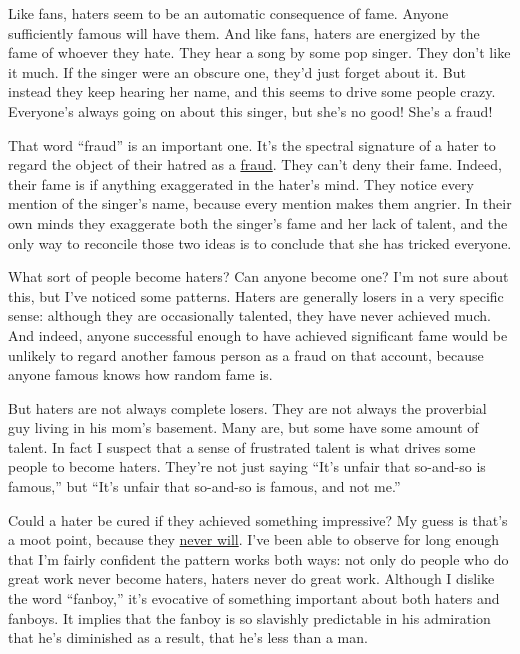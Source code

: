 Like fans, haters seem to be an automatic consequence of fame. Anyone
sufficiently famous will have them. And like fans, haters are energized
by the fame of whoever they hate. They hear a song by some pop singer.
They don't like it much. If the singer were an obscure one, they'd just
forget about it. But instead they keep hearing her name, and this seems
to drive some people crazy. Everyone's always going on about this
singer, but she's no good! She's a fraud!

That word ``fraud'' is an important one. It's the spectral signature of
a hater to regard the object of their hatred as a
\href{https://twitter.com/search?q=Musk\%20fraud&src=typed_query&f=live}{fraud}.
They can't deny their fame. Indeed, their fame is if anything
exaggerated in the hater's mind. They notice every mention of the
singer's name, because every mention makes them angrier. In their own
minds they exaggerate both the singer's fame and her lack of talent, and
the only way to reconcile those two ideas is to conclude that she has
tricked everyone.

What sort of people become haters? Can anyone become one? I'm not sure
about this, but I've noticed some patterns. Haters are generally losers
in a very specific sense: although they are occasionally talented, they
have never achieved much. And indeed, anyone successful enough to have
achieved significant fame would be unlikely to regard another famous
person as a fraud on that account, because anyone famous knows how
random fame is.

But haters are not always complete losers. They are not always the
proverbial guy living in his mom's basement. Many are, but some have
some amount of talent. In fact I suspect that a sense of frustrated
talent is what drives some people to become haters. They're not just
saying ``It's unfair that so-and-so is famous,'' but ``It's unfair that
so-and-so is famous, and not me.''

Could a hater be cured if they achieved something impressive? My guess
is that's a moot point, because they \href{mean.html}{never will}. I've
been able to observe for long enough that I'm fairly confident the
pattern works both ways: not only do people who do great work never
become haters, haters never do great work. Although I dislike the word
``fanboy,'' it's evocative of something important about both haters and
fanboys. It implies that the fanboy is so slavishly predictable in his
admiration that he's diminished as a result, that he's less than a man.

